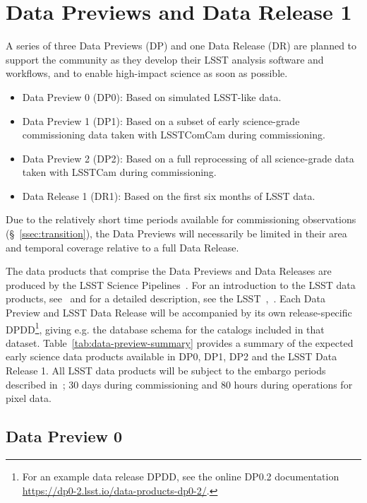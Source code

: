 \section{Data Previews and Data Release 1} 
\label{sec:datapreview}

A series of three Data Previews (DP) and one Data Release (DR) are planned to support the community as they develop their LSST analysis software and workflows, and to enable high-impact science as soon as possible.
\begin{itemize}
\item Data Preview 0 (DP0): Based on simulated LSST-like data.
\item Data Preview 1 (DP1): Based on a subset of early science-grade commissioning data taken with LSSTComCam during commissioning.
\item Data Preview 2 (DP2): Based on a full reprocessing of all science-grade data taken with LSSTCam during commissioning.
\item Data Release 1 (DR1): Based on the first six months of LSST data. 
\end{itemize}
Due to the relatively short time periods available for commissioning observations (\S~\ref{ssec:transition}), the Data Previews will necessarily be limited in their area and temporal coverage relative to a full Data Release. 

The data products that comprise the Data Previews and Data Releases are produced by the LSST Science Pipelines~\citep{2019ASPC..523..521B,2018PASJ...70S...5B}.
For an introduction to the LSST data products, see~\citet{RubinDataProductsAbridged} and for a detailed description, see the LSST~\dpdd{},~.
Each Data Preview and LSST Data Release will be accompanied by its own release-specific DPDD\footnote{For an example data release DPDD, see the online DP0.2 documentation {\url{https://dp0-2.lsst.io/data-products-dp0-2/}}.}, giving e.g. the  database schema for the catalogs included in that dataset.
Table~\ref{tab:data-preview-summary} provides a summary of the expected early science data products available in DP0, DP1, DP2 and the LSST Data Release 1.
All LSST data products will be subject to the embargo periods described in~; 30 days during commissioning and 80 hours during operations for pixel data.



\subsection{Data Preview 0}
\label{sec:dp0}

